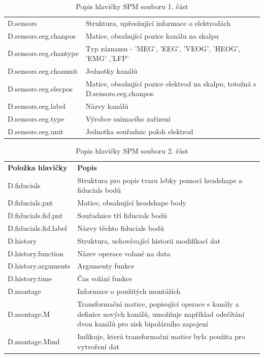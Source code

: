 \begin{table}
\begin{ctucolortab}
\begin{tabular}{lp{8.5cm}}
D.sensors & 	Struktura, upřesňující informace o elektrodách \\
D.sensors.eeg.chanpos & 	Matice, obsahující pozice kanálu na skalpu \\
D.sensors.eeg.chantype & 	Typ záznamu - 'MEG', 'EEG', 'VEOG', 'HEOG', 'EMG' ,'LFP' \\
D.sensors.eeg.chanunit & 	Jednotky kanálů \\
D.sensors.eeg.elecpos & 	Matice, obsahující pozice elektrod na skalpu, totožná s D.sensors.eeg.chanpos \\
D.sensors.eeg.label & 	Názvy kanálů \\
D.sensors.eeg.type & 	Výrobce snímacího zařízení \\
D.sensors.eeg.unit & 	Jednotka souřadnic poloh elektrod
\end{tabular}
\end{ctucolortab}
\caption{Popis hlavičky SPM souboru 1. část}
\label{SPMhlavicka1cast}
\end{table}


\begin{table}
\begin{ctucolortab}
\begin{tabular}{lp{8.5cm}}
\bfseries Položka hlavičky & \bfseries Popis \\
\Midrule
D.fiducials & 	Struktura pro popis tvaru lebky pomocí headshape a fiducials bodů \\
D.fiducials.pnt & 	Matice, obsahující headshape body \\
D.fiducials.fid.pnt & 	Souřadnice tří fiducials bodů \\
D.fiducials.fid.label & 	Názvy těchto fiducials bodů \\
D.history & 	Struktura, uchovávající historii modifikací dat \\
D.history.function & 	Název operace volané na data \\
D.history.arguments & 	Argumenty funkce \\
D.history.time & 	Čas volání funkce \\
D.montage & 	Informace o použitých montážích \\
D.montage.M & 	Transformační matice, popisující operace s kanály a definice nových kanálů, umožňuje například odečítání dvou kanálů pro zisk bipolárního zapojení \\
D.montage.Mind & 	Indikuje, která transformační matice byla použita pro vytvoření dat
\end{tabular}
\end{ctucolortab}
\caption{Popis hlavičky SPM souboru 2. část}
\label{SPMhlavicka2cast}
\end{table}

